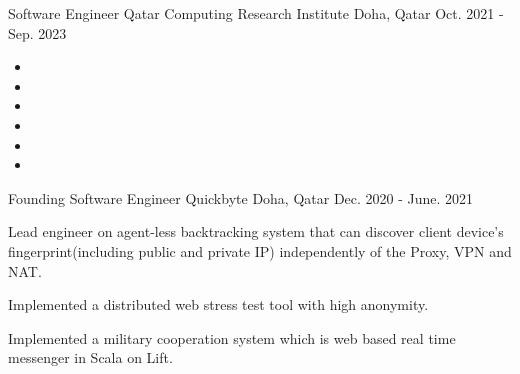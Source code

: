 \begin{cventries}
  \cventry
    {Software Engineer} %
    {Qatar Computing Research Institute} %
    {Doha, Qatar} %
    {Oct. 2021 - Sep. 2023} %
    {
      \vspace{-4.0mm}
      \begin{justify}
      \begin{itemize}[leftmargin=2ex, nosep, noitemsep]
        \setlength{\parskip}{0pt}
        \renewcommand{\labelitemi}{}
        \item {}
        \renewcommand{\labelitemi}{\bullet}
        \item {}
        \item {}
        \renewcommand{\labelitemi}{}
        \item {}
        \renewcommand{\labelitemi}{\bullet}
        \item {}
        \item {}
      \end{itemize}
      \end{justify}
      \vspace{1.0mm}
    }

  \cventry
    {Founding Software Engineer} %
    {Quickbyte} %
    {Doha, Qatar} %
    {Dec. 2020 - June. 2021} %
    {
      \begin{cvitems} %
        \item {Lead engineer on agent-less backtracking system that can discover client device's fingerprint(including public and private IP) independently of the Proxy, VPN and NAT.}
        \item {Implemented a distributed web stress test tool with high anonymity.}
        \item {Implemented a military cooperation system which is web based real time messenger in Scala on Lift.}
      \end{cvitems}
    }


\end{cventries}
